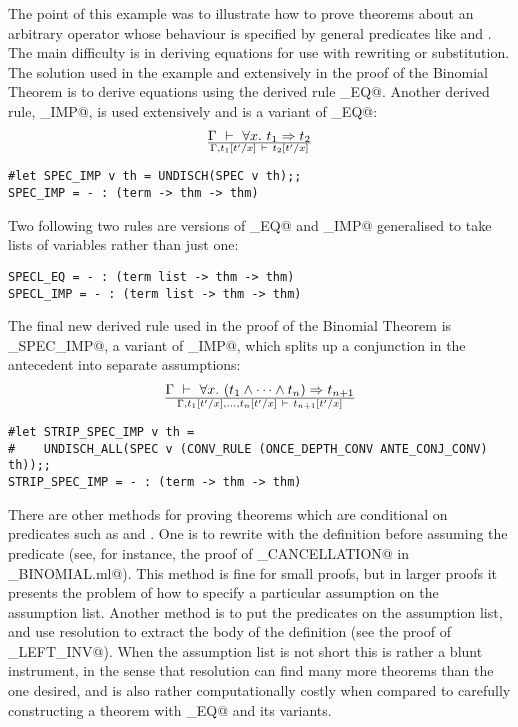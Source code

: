 The point of this example was to illustrate how to prove theorems about 
an arbitrary operator whose behaviour is specified by general predicates 
like \verb@ASSOCIATIVE@ and \verb@COMMUTATIVE@. The main difficulty is 
in deriving equations for use with rewriting or substitution.  The solution 
used in the example and extensively in the proof of the Binomial Theorem 
is to derive equations using the derived rule \verb@SPEC_EQ@. Another derived 
rule, \verb@SPEC_IMP@, is used extensively and is a variant of \verb@SPEC_EQ@:
\[
\Gamma\ \vdash\  \forall x.\  t_1 \Rightarrow t_2
\over
\Gamma, t_1[t'/x] \ \vdash\  t_2[t'/x]
\]
\begin{session}
\begin{verbatim}
#let SPEC_IMP v th = UNDISCH(SPEC v th);;
SPEC_IMP = - : (term -> thm -> thm)
\end{verbatim}
\end{session}
Two following two rules are versions of \verb@SPEC_EQ@ and \verb@SPEC_IMP@ 
generalised to take lists of variables rather than just one:
\begin{session}
\begin{verbatim}
SPECL_EQ = - : (term list -> thm -> thm)
SPECL_IMP = - : (term list -> thm -> thm)
\end{verbatim}
\end{session}
The final new derived rule used in the proof of the Binomial Theorem
is \verb@STRIP_SPEC_IMP@, a variant of \verb@SPEC_IMP@, which
splits up a conjunction in the antecedent into separate assumptions:
\[
\Gamma\ \vdash\  \forall x.\  (t_1 \wedge \cdots \wedge t_n) \Rightarrow t_{n+1}
\over
\Gamma, t_1[t'/x], \ldots, t_n[t'/x] \ \vdash\  t_{n+1}[t'/x]
\]
\begin{session}
\begin{verbatim}
#let STRIP_SPEC_IMP v th =
#    UNDISCH_ALL(SPEC v (CONV_RULE (ONCE_DEPTH_CONV ANTE_CONJ_CONV) th));;
STRIP_SPEC_IMP = - : (term -> thm -> thm)
\end{verbatim}
\end{session}

There are other methods for proving theorems which are conditional on 
predicates such as \verb@ASSOCIATIVE@ and \verb@COMMUTATIVE@.  One is to 
rewrite with the definition before assuming the predicate (see, for instance, 
the proof of \verb@RIGHT_CANCELLATION@ in \verb@mk_BINOMIAL.ml@). This 
method is fine for small proofs, but in larger proofs it presents the problem 
of how to specify a particular assumption on the assumption list.  Another 
method is to put the predicates on the assumption list, and use resolution 
to extract the body of the definition (see the proof of 
\verb@UNIQUE_LEFT_INV@).  When the assumption list is not short this is 
rather a blunt instrument, in the sense that resolution can find many more 
theorems than the one desired, and is also rather computationally costly 
when compared to carefully constructing a theorem with \verb@SPEC_EQ@ and 
its variants.

